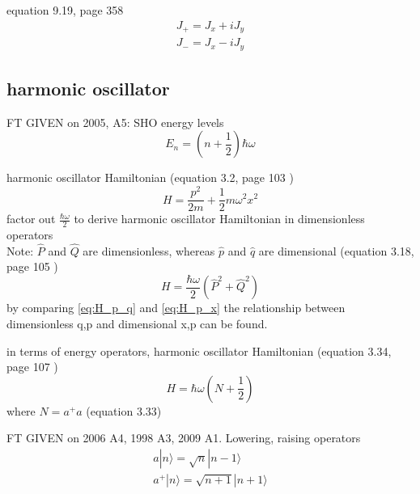 \documentclass[12pt]{article}  %
\def\qualifyingyear{F}
\begin{document}
equation 9.19, page 358 \cite{LiboffQM}
\begin{equation}
\begin{gathered}
J_+ = J_x + i J_y \\ 
J_- = J_x - i J_y
\end{gathered}
\end{equation}

\subsection{harmonic oscillator}

\if\qualifyingyear T
GIVEN on 2005, A5: 
\fi
SHO energy levels
\begin{equation}
  E_n = (n+\frac{1}{2})\hbar \omega
	\label{eq:SHO_energy}
\end{equation}

harmonic oscillator Hamiltonian (equation 3.2, page 103  \cite{ParrisQM})
\begin{equation}
H = \frac{p^2}{2 m}+ \frac{1}{2} m \omega^2 x^2
\label{eq:H_p_x}
\end{equation}
factor out $\frac{\hbar \omega}{2}$ to derive harmonic oscillator Hamiltonian in dimensionless operators \\ 
Note: $\hat{P}$ and $\hat{Q}$ are dimensionless, whereas $\hat{p}$ and $\hat{q}$ are dimensional
(equation 3.18, page 105 \cite{ParrisQM})
\begin{equation}
H = \frac{\hbar \omega}{2} (\hat{P}^2 + \hat{Q}^2)
\label{eq:H_p_q}
\end{equation}
by comparing \ref{eq:H_p_q} and \ref{eq:H_p_x} the relationship between
dimensionless q,p and dimensional x,p can be found.

in terms of energy operators, harmonic oscillator Hamiltonian (equation 3.34, page 107  \cite{ParrisQM})
\begin{equation}
H = \hbar \omega (N+ \frac{1}{2})
\end{equation}
where $N = a^+ a$ (equation 3.33)

\if\qualifyingyear T
GIVEN on 2006 A4, 1998 A3, 2009 A1. 
\fi 
Lowering, raising operators
\begin{equation}
\begin{gathered}
 a|n\rangle =\sqrt{n}|n-1 \rangle \\ 
 a^+|n\rangle =\sqrt{n+1}|n+1 \rangle 
  \label{eq:raising_lowering}
\end{gathered}
\end{equation}
\end{document}
